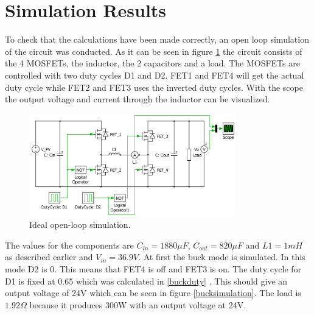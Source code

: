 \section{Simulation Results}

To check that the calculations have been made correctly, an open loop simulation of the circuit was conducted. As it can be seen in figure \ref{fig:openloop_schematic} the circuit consists of the 4 MOSFETs, the inductor, the 2 capacitors and a load. The MOSFETs are controlled with two duty cycles D1 and D2. FET1 and FET4 will get the actual duty cycle while FET2 and FET3 uses the inverted duty cycles. With the scope the output voltage and current through the inductor can be visualized.

\begin{figure}[H]
	\begin{center}
		\includegraphics[width=0.8\textwidth]{../Pictures/P1/Open_loop_simulation/open_loop_schematic}
		\caption{Ideal open-loop simulation.}
		\label{fig:openloop_schematic}
	\end{center}
\end{figure}
The values for the components are $C_{in}=1880\mu F$, $C_{out}=820\mu F$ and $L1=1mH$ as described earlier  and $V_{in}=36.9V$. At first the buck mode is simulated. In this mode D2 is 0. This means that FET4 is off and FET3 is on. The duty cycle for D1 is fixed at 0.65 which was calculated in \ref{buckduty} . This should give an output voltage of 24V which can be seen in figure \ref{bucksimulation}. The load is $1.92\Omega$ because it produces 300W with an output voltage at 24V.     


